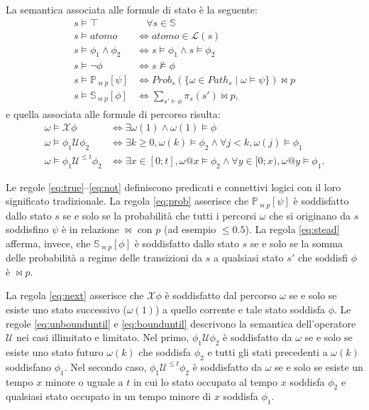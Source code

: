 	La semantica associata alle formule di stato \`e la seguente:
	\begin{align}
		s \models \top &\quad\forall s \in \mathbb{S}\label{eq:true}\\
		s \models atomo &\iff atomo \in \mathcal{L}(s)\\
		s \models \phi_1 \wedge \phi_2 &\iff s \models \phi_1 \wedge s \models \phi_2\\
		s \models \neg \phi &\iff s \not \models \phi\label{eq:not}\\
		s \models \mathbb{P}_{\bowtie p} [\psi] &\iff Prob_s(\{\omega \in Path_s \mid \omega \models \psi\}) \bowtie p\label{eq:prob}\\
		s \models \mathbb{S}_{\bowtie p} [\phi] &\iff \underset{s' \models \phi}{\sum} \pi_s(s') \bowtie p\label{eq:stead},
	\end{align}
	e quella associata alle formule di percorso risulta:
	\begin{align}
		\omega \models \mathcal{X} \phi &\iff \exists \omega(1) \wedge \omega(1) \models \phi\label{eq:next}\\
		\omega \models \phi_1 \mathcal{U} \phi_2 &\iff \exists k \geq 0, \omega(k) \models \phi_2 \wedge \forall j < k, \omega(j) \models \phi_1\label{eq:unbounduntil}\\
		\omega \models \phi_1 \mathcal{U}^{\leq t} \phi_2 &\iff \exists x \in [0; t], \omega @ x \models \phi_2 \wedge \forall y \in [0; x), \omega @ y \models \phi_1\label{eq:bounduntil}.
	\end{align}
	
	Le regole \ref{eq:true}--\ref{eq:not} definiscono predicati e connettivi logici con il loro significato tradizionale.
	La regola \ref{eq:prob} asserisce che $\mathbb{P}_{\bowtie p} [\psi]$ \`e soddisfatto dallo stato $s$ se e solo se la probabilit\`a che tutti i percorsi $\omega$ che si originano da $s$ soddisfino $\psi$ \`e in relazione $\bowtie$ con $p$ (ad esempio $\leq 0.5$).
	La regola \ref{eq:stead} afferma, invece, che $\mathbb{S}_{\bowtie p} [\phi]$ \`e soddisfatto dallo stato $s$ se e solo se la somma delle probabilit\`a a regime delle transizioni da $s$ a qualsiasi stato $s'$ che soddisfi $\phi$ \`e $\bowtie p$.
	
	La regola \ref{eq:next} asserisce che $\mathcal{X} \phi$ \`e soddisfatto dal percorso $\omega$ se e solo se esiste uno stato successivo ($\omega(1)$) a quello corrente e tale stato soddisfa $\phi$.
	Le regole \ref{eq:unbounduntil} e \ref{eq:bounduntil} descrivono la semantica dell'operatore $\mathcal{U}$ nei casi illimitato e limitato.
	Nel primo, $\phi_1 \mathcal{U} \phi_2$ \`e soddisfatto da $\omega$ se e solo se esiste uno stato futuro $\omega(k)$ che soddisfa $\phi_2$ e tutti gli stati precedenti a $\omega(k)$ soddisfano $\phi_1$.
	Nel secondo caso, $\phi_1 \mathcal{U}^{\leq t} \phi_2$ \`e soddisfatto da $\omega$ se e solo se esiste un tempo $x$ minore o uguale a $t$ in cui lo stato occupato al tempo $x$ soddisfa $\phi_2$ e qualsiasi stato occupato in un tempo minore di $x$ soddisfa $\phi_1$.
	
